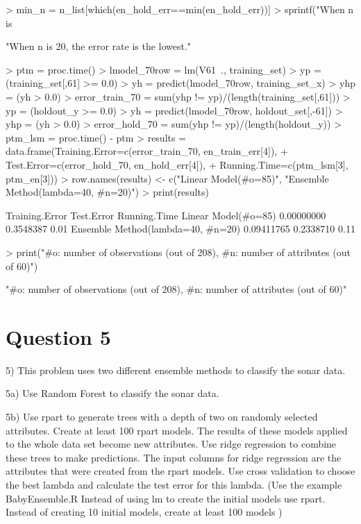 \documentclass{article}
\begin{document}
\begin{Schunk}
\begin{Sinput}
> min_n = n_list[which(en_hold_err==min(en_hold_err))]
> sprintf("When n is %d, the error rate is the lowest.", min_n)
\end{Sinput}
\begin{Soutput}
[1] "When n is 20, the error rate is the lowest."
\end{Soutput}
\begin{Sinput}
> ptm = proc.time()
> lmodel_70row = lm(V61~., training_set)
> yp = (training_set[,61] >= 0.0)
> yh = predict(lmodel_70row, training_set_x)
> yhp = (yh > 0.0)
> error_train_70 = sum(yhp != yp)/(length(training_set[,61]))
> yp = (holdout_y >= 0.0)
> yh = predict(lmodel_70row, holdout_set[,-61])
> yhp = (yh > 0.0)
> error_hold_70 = sum(yhp != yp)/(length(holdout_y))
> ptm_lsm = proc.time() - ptm
> results = data.frame(Training.Error=c(error_train_70, en_train_err[4]),
+                      Test.Error=c(error_hold_70, en_hold_err[4]),
+                      Running.Time=c(ptm_lsm[3], ptm_en[3]))
> row.names(results) <- c("Linear Model(#o=85)", "Ensemble Method(lambda=40, #n=20)")
> print(results)
\end{Sinput}
\begin{Soutput}
                                  Training.Error Test.Error Running.Time
Linear Model(#o=85)                   0.00000000  0.3548387         0.01
Ensemble Method(lambda=40, #n=20)     0.09411765  0.2338710         0.11
\end{Soutput}
\begin{Sinput}
> print("#o: number of observations (out of 208), #n: number of attributes (out of 60)")
\end{Sinput}
\begin{Soutput}
[1] "#o: number of observations (out of 208), #n: number of attributes (out of 60)"
\end{Soutput}
\end{Schunk}


\section*{Question 5}

5) This problem uses two different ensemble methods to classify the sonar
data.

5a) Use Random Forest to classify the sonar data.

5b) Use rpart to generate trees with a depth of two on randomly selected
attributes. Create at least 100 rpart models. The results of these models
applied to the whole data set become new attributes. Use ridge regression
to combine these trees to make predictions. The input columns for ridge
regression are the attributes that were created from the rpart models. Use
cross validation to choose the best lambda and calculate the test error for
this lambda. (Use the example BabyEnsemble.R Instead of using lm to
create the initial models use rpart. Instead of creating 10 initial models,
create at least 100 models )
\end{document}
